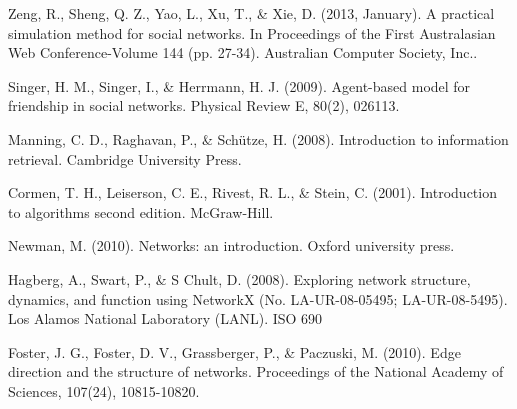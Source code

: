 \documentclass[a4paper,12pt]{article}
\begin{document}
\begin{thebibliography}{9}
  Zeng, R., Sheng, Q. Z., Yao, L., Xu, T., \& Xie, D. (2013, January). A practical simulation method for social networks. In Proceedings of the First Australasian Web Conference-Volume 144 (pp. 27-34). Australian Computer Society, Inc..
  
  Singer, H. M., Singer, I., \& Herrmann, H. J. (2009). Agent-based model for friendship in social networks. Physical Review E, 80(2), 026113.

  Manning, C. D., Raghavan, P., \& Schütze, H. (2008). Introduction to information retrieval. Cambridge University Press.
  
  Cormen, T. H., Leiserson, C. E., Rivest, R. L., \& Stein, C. (2001). Introduction to algorithms second edition. McGraw-Hill.
  
  Newman, M. (2010). Networks: an introduction. Oxford university press.
  
  Hagberg, A., Swart, P., \& S Chult, D. (2008). Exploring network structure, dynamics, and function using NetworkX (No. LA-UR-08-05495; LA-UR-08-5495). Los Alamos National Laboratory (LANL).
ISO 690	

  Foster, J. G., Foster, D. V., Grassberger, P., \& Paczuski, M. (2010). Edge direction and the structure of networks. Proceedings of the National Academy of Sciences, 107(24), 10815-10820.
\end{thebibliography}
\end{document}
